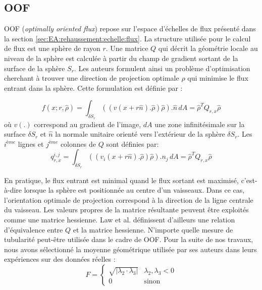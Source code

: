 \subsection{OOF}

OOF (\textit{optimally oriented flux}) repose sur l'espace d'échelles de flux présenté dans la section \ref{sec:EA:rehaussement:echelle:flux}. La structure utilisée pour le calcul de flux est une sphère de rayon $r$. Une matrice $Q$ qui décrit la géométrie locale au niveau de la sphère est calculée à partir du champ de gradient sortant de la surface de la sphère $S_r$. Les auteurs formulent ainsi un problème d'optimisation cherchant à trouver une direction de projection optimale  $\widehat{\rho}$ qui minimise le flux entrant dans la sphère. Cette formulation est définie par :

\begin{equation}
    f(x;r, \widehat{\rho} )= \int_{\delta S_r} (( v(x + r\widehat{n}).\widehat{\rho})\widehat{\rho}). \widehat{n}\,dA = \widehat{\rho}^{T}Q_{r,x}\widehat{\rho}  	\nonumber
\end{equation}
où $v(.)$ correspond au gradient de l'image, $dA$ une zone infinitésimale sur la surface $\delta S_r$ et $\widehat{n}$ la normale unitaire orienté vers l'extérieur de la sphère $\delta S_r$.
Les $i^{ème}$ lignes et $j^{ème}$ colonnes de $Q$ sont définies par: 
\begin{equation}
    q_{r,x}^{i,j} = \int_{\delta S_r} (( v_i(x + r\widehat{n}).\widehat{\rho})\widehat{\rho}).n_j\,dA = \widehat{\rho}^{T}Q_{r,x}\widehat{\rho}  \nonumber	
\end{equation}

En pratique, le flux entrant est minimal quand le flux sortant est maximisé, c'est-à-dire lorsque la sphère est positionnée au centre d'un vaisseaux. Dans ce cas, l'orientation optimale de projection correspond à la direction de la ligne centrale du vaisseau. Les valeurs propres de la matrice résultante peuvent être exploités comme une matrice hessienne. Law et al. définissent d'ailleurs une relation d'équivalence entre $Q$ et la matrice hessienne.
N'importe quelle mesure de tubularité peut-être utilisée dans le cadre de OOF. Pour la suite de nos travaux, nous avons sélectionné la moyenne géométrique utilisée par ses auteurs dans leurs expériences sur des données réelles :
\begin{equation}
\nonumber
    F =
    \left\{
    \begin{array}{lr}
    
    \sqrt{|\lambda_2 \cdot \lambda_3|}   & \lambda_2, \lambda_3 < 0 \\
    0     & \textrm{sinon}
    \end{array}
    \right.
\end{equation}

